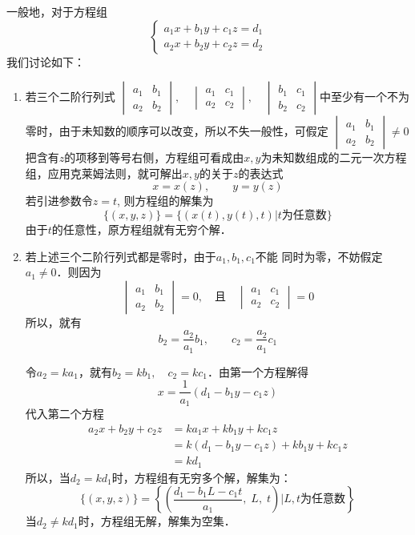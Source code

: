 一般地，对于方程组
\[\begin{cases}
    a_1x+b_1y+c_1z=d_1\\
    a_2x+b_2y+c_2z=d_2
\end{cases}\]
我们讨论如下：

\begin{enumerate}
    \item 若三个二阶行列式
$\begin{vmatrix}
    a_1&b_1\\a_2&b_2
\end{vmatrix},\quad \begin{vmatrix}
    a_1&c_1\\a_2&c_2
\end{vmatrix},\quad \begin{vmatrix}
    b_1&c_1\\b_2&c_2
\end{vmatrix}$中至少有一个不为零时，由于未知数的顺序可以改变，所以不失一般性，可假定
$\begin{vmatrix}
    a_1&b_1\\a_2&b_2
\end{vmatrix}\ne 0$
把含有$z$的项移到等号右侧，方程组可看成由$x,y$为未知数组成的二元一次方程组，应用克莱姆法则，就可解出$x,y$的关于$z$的表达式
\[x=x (z) ,\qquad y=y (z) \]
若引进参数令$z=t$, 则方程组的解集为
\[\{(x,y,z)\} =\{(x(t),y(t),t)|\text{$t$为任意数}\}\]
由于$t$的任意性，原方程组就有无穷个解．
\item  若上述三个二阶行列式都是零时，由于$a_1,b_1,c_1$不能
同时为零，不妨假定$a_1\ne 0$．则因为
\[\begin{vmatrix}
    a_1&b_1\\a_2&b_2
\end{vmatrix}=0,\quad \text{且}\quad \begin{vmatrix}
    a_1&c_1\\a_2&c_2
\end{vmatrix}=0\]
所以，就有
\[b_2=\frac{a_2}{a_1}b_1,\qquad c_2=\frac{a_2}{a_1}c_1\]

令$a_2=ka_1$，就有$b_2=kb_1,\quad c_2=kc_1$．由第一个方程解得
\[x=\frac{1}{a_1}(d_1-b_1y-c_1z)\]
代入第二个方程
\[\begin{split}
    a_2x+b_2y+c_2z&=ka_1x+kb_1y+kc_1z\\
    &=k(d_1-b_1y-c_1z)+kb_1y+kc_1z\\
    &=kd_1
\end{split}\]
所以，当$d_2=kd_1$时，方程组有无穷多个解，解集为：
\[\{(x,y,z)\}=\left\{\left(\frac{d_1-b_1L-c_1t}{a_1},\;L,\;t\right)\big|\text{$L,t$为任意数}\right\}\]
当$d_2\ne kd_1$时，方程组无解，解集为空集．
\end{enumerate}
    
